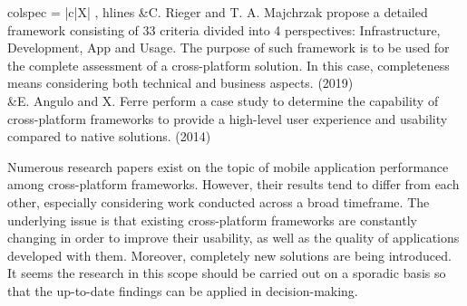 \begin{longtblr}[
    caption = {Related work (Source: Own work)},
    label = {tab:related_work},
]{ colspec = { |c|X| }, hlines}
    \cite{rieger_eval_cp}&C. Rieger and T. A. Majchrzak propose a detailed framework consisting of 33 criteria divided into 4 perspectives: Infrastructure, Development, App and Usage. The purpose of such framework is to be used for the complete assessment of a cross-platform solution. In this case, completeness means considering both technical and business aspects. (2019)\\
    \cite{cross_platform_ux}&E. Angulo and X. Ferre perform a case study to determine the capability of cross-platform frameworks to provide a high-level user experience and usability compared to native solutions. (2014)\\
\end{longtblr}

Numerous research papers exist on the topic of mobile application performance among cross-platform frameworks. However, their results tend to differ from each other, especially considering work conducted across a broad timeframe. The underlying issue is that existing cross-platform frameworks are constantly changing in order to improve their usability, as well as the quality of applications developed with them. Moreover, completely new solutions are being introduced. It seems the research in this scope should be carried out on a sporadic basis so that the up-to-date findings can be applied in decision-making.

\clearpage
